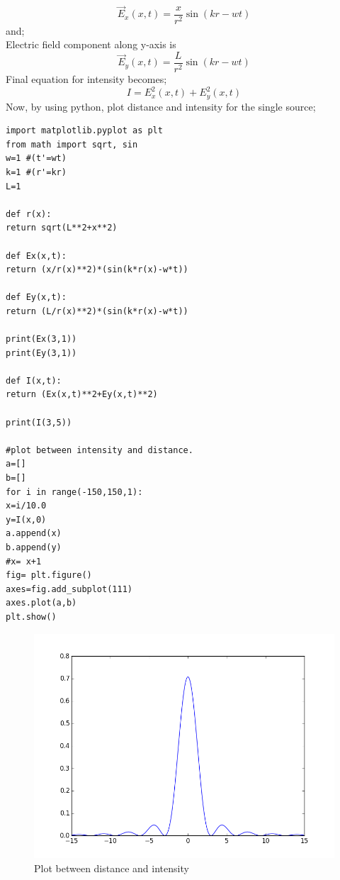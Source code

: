 \begin{equation}
\vec{E}_x(x,t) = \frac{x}{r^2}\sin(kr-wt)
\end{equation}
and;\\
Electric field component along y-axis is\\
\begin{equation}
\vec{E}_y(x,t) = \frac{L}{r^2}\sin(kr-wt)
\end{equation}
Final equation for intensity becomes;\\
\begin{equation}
I = E_x^2(x,t)+E_y^2(x,t)
\end{equation}
Now, by using python, plot distance and intensity for the single source;\\
\begin{verbatim}
import matplotlib.pyplot as plt
from math import sqrt, sin
w=1 #(t'=wt)
k=1 #(r'=kr)
L=1

def r(x):
return sqrt(L**2+x**2)

def Ex(x,t):
return (x/r(x)**2)*(sin(k*r(x)-w*t))

def Ey(x,t):
return (L/r(x)**2)*(sin(k*r(x)-w*t))

print(Ex(3,1))
print(Ey(3,1))

def I(x,t):
return (Ex(x,t)**2+Ey(x,t)**2)

print(I(3,5))

#plot between intensity and distance.
a=[]
b=[]
for i in range(-150,150,1):
x=i/10.0
y=I(x,0)
a.append(x)
b.append(y)
#x= x+1
fig= plt.figure()
axes=fig.add_subplot(111)
axes.plot(a,b)
plt.show()
\end{verbatim}

\begin{figure}[ht]
\centering	
\includegraphics[scale=0.45]{figure_1.png}
\caption{Plot between distance and intensity}
\end{figure}

